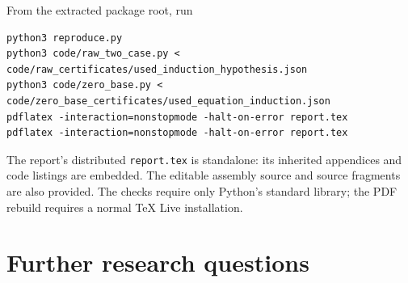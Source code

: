 \documentclass[11pt]{article}
\theoremstyle{definition}
\DeclareRobustCommand{\file}[1]{\nolinkurl{#1}}
\begin{document}
From the extracted package root, run
\begin{lstlisting}
python3 reproduce.py
python3 code/raw_two_case.py < code/raw_certificates/used_induction_hypothesis.json
python3 code/zero_base.py < code/zero_base_certificates/used_equation_induction.json
pdflatex -interaction=nonstopmode -halt-on-error report.tex
pdflatex -interaction=nonstopmode -halt-on-error report.tex
\end{lstlisting}
The report's distributed \file{report.tex} is standalone: its inherited
appendices and code listings are embedded. The editable assembly source
and source fragments are also provided. The checks require only Python's
standard library; the PDF rebuild requires a normal TeX Live installation.

\section{Further research questions}
\label{sec:questions}
\end{document}
